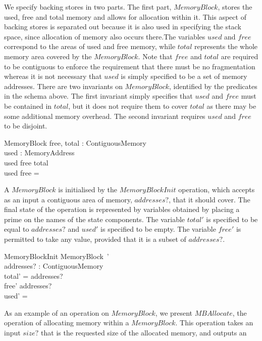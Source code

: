 \documentclass[a4paper,10pt]{report}
\begin{document}
We specify backing stores in two parts. The first part, $MemoryBlock$, stores
the used, free and total memory and allows for allocation within it. This aspect
of backing stores is separated out because it is also used in specifying the
stack space, since allocation of memory also occurs there.The variables $used$
and $free$ correspond to the areas of used and free memory, while $total$
represents the whole memory area covered by the $MemoryBlock$. Note that $free$
and $total$ are required to be contiguous to enforce the requirement that there
must be no fragmentation whereas it is not necessary that $used$ is simply
specified to be a set of memory addresses. There are two invariants on
$MemoryBlock$, identified by the predicates in the schema above. The first
invariant simply specifies that $used$ and $free$ must be contained in $total$,
but it does not require them to cover $total$ as there may be some additional
memory overhead. The second invariant requires $used$ and $free$ to be disjoint.
%
\begin{schema}{MemoryBlock}
  free, total : ContiguousMemory \\
  used : \power MemoryAddress \\
\where
  used \cup free \subseteq total \\
  used \cap free = \emptyset \\
\end{schema}
%
A $MemoryBlock$ is initialised by the $MemoryBlockInit$ operation, which accepts
as an input a contiguous area of memory, $addresses?$, that it should cover. The
final state of the operation is represented by variables obtained by placing a
prime on the names of the state components. The variable $total'$ is specified
to be equal to $addresses?$ and $used'$ is specified to be empty. The variable
$free'$ is permitted to take any value, provided that it is a subset of
$addresses?$.
%
\begin{schema}{MemoryBlockInit}
  MemoryBlock~' \\
  addresses? : ContiguousMemory \\
\where
  total' = addresses? \\
  free' \subseteq addresses? \\
  used' = \emptyset \\
\end{schema}
%
As an example of an operation on $MemoryBlock$, we present $MBAllocate$, the
operation of allocating memory within a $MemoryBlock$. This operation takes an
input $size?$ that is the requested size of the allocated memory, and outputs an
\end{document}
